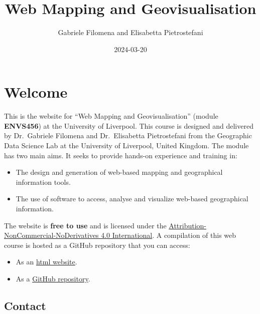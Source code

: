 \documentclass[
  letterpaper,
  DIV=11,
  numbers=noendperiod]{scrreprt}
\title{Web Mapping and Geovisualisation}
\author{Gabriele Filomena and Elisabetta Pietrostefani}
\date{2024-03-20}
\providecommand{\tightlist}{%
  \setlength{\itemsep}{0pt}\setlength{\parskip}{0pt}}\usepackage{longtable,booktabs,array}
\renewcommand*\contentsname{Table of contents}
\newcommand\contentsname{Table of contents}
\begin{document}
\maketitle
\ifdefined\Shaded\renewenvironment{Shaded}{\begin{tcolorbox}[frame hidden, enhanced, breakable, sharp corners, boxrule=0pt, interior hidden, borderline west={3pt}{0pt}{shadecolor}]}{\end{tcolorbox}}\fi

\renewcommand*\contentsname{Table of contents}
{
\hypersetup{linkcolor=}
\setcounter{tocdepth}{2}
\tableofcontents
}

\hypertarget{welcome}{%
\chapter*{Welcome}\label{welcome}}


This is the website for ``Web Mapping and Geovisualisation'' (module
\textbf{ENVS456}) at the University of Liverpool. This course is
designed and delivered by Dr.~Gabriele Filomena and Dr.~Elisabetta
Pietrostefani from the Geographic Data Science Lab at the University of
Liverpool, United Kingdom. The module has two main aims. It seeks to
provide hands-on experience and training in:

\begin{itemize}
\tightlist
\item
  The design and generation of web-based mapping and geographical
  information tools.
\item
  The use of software to access, analyse and visualize web-based
  geographical information.
\end{itemize}

The website is \textbf{free to use} and is licensed under the
\href{https://creativecommons.org/licenses/by-nc-nd/4.0/}{Attribution-NonCommercial-NoDerivatives
4.0 International}. A compilation of this web course is hosted as a
GitHub repository that you can access:

\begin{itemize}
\tightlist
\item
  As an \href{https://gdsl-ul.github.io/wma}{html website}.
\item
  As a \href{https://github.com/GDSL-UL/wma}{GitHub repository}.
\end{itemize}

\hypertarget{contact}{%
\section*{Contact}\label{contact}}
\end{document}
